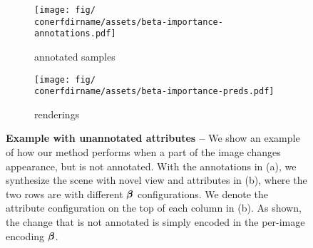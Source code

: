 \begin{figure}
  \centering
  \begin{subfigure}[t]{0.38\linewidth}
    \centering
    \texttt{[image: fig/\\conerfdirname/assets/beta-importance-annotations.pdf]}
    \caption{annotated samples}
  \end{subfigure}
  \hfill{}
  \begin{subfigure}[t]{0.595\linewidth}
    \centering
    \texttt{[image: fig/\\conerfdirname/assets/beta-importance-preds.pdf]}
    \caption{renderings}
  \end{subfigure}
  \caption{{\bf Example with unannotated attributes --}
    We show an example of how our method performs when a part of the image
    changes appearance, but is not annotated.
    With the annotations in (a), we synthesize the scene with novel view and
    attributes in (b), where the two rows are with different ${\boldsymbol{\beta}}$
    configurations.
    We denote the attribute configuration on the top of each column in (b).
    As shown, the change that is not annotated is simply encoded in the
    per-image encoding ${\boldsymbol{\beta}}$.
  }
  \label{fig:conerf-ablation_unannotated}
\end{figure}